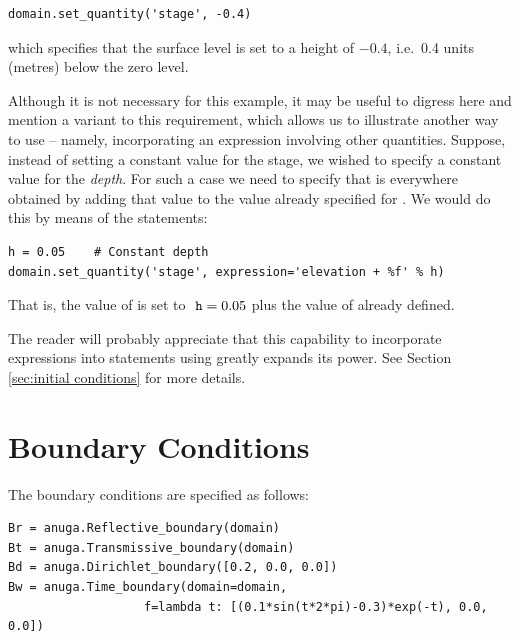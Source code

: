 \documentclass{manual}
\begin{document}
\begin{verbatim}
domain.set_quantity('stage', -0.4)
\end{verbatim}

which specifies that the surface level is set to a height of $-0.4$,
i.e.\ 0.4 units (metres) below the zero level.

Although it is not necessary for this example, it may be useful to
digress here and mention a variant to this requirement, which allows
us to illustrate another way to use  -- namely,
incorporating an expression involving other quantities. Suppose,
instead of setting a constant value for the stage, we wished to
specify a constant value for the \emph{depth}. For such a case we
need to specify that  is everywhere obtained by adding
that value to the value already specified for . We
would do this by means of the statements:

\begin{verbatim}
h = 0.05    # Constant depth
domain.set_quantity('stage', expression='elevation + %f' % h)
\end{verbatim}

That is, the value of  is set to $\code{h} = 0.05$ plus
the value of  already defined.

The reader will probably appreciate that this capability to
incorporate expressions into statements using 
greatly expands its power. See Section \ref{sec:initial conditions} for more
details.

\section{Boundary Conditions}

The boundary conditions are specified as follows:

\begin{verbatim}
Br = anuga.Reflective_boundary(domain)
Bt = anuga.Transmissive_boundary(domain)
Bd = anuga.Dirichlet_boundary([0.2, 0.0, 0.0])
Bw = anuga.Time_boundary(domain=domain,
                   f=lambda t: [(0.1*sin(t*2*pi)-0.3)*exp(-t), 0.0, 0.0])
\end{verbatim}
\end{document}
